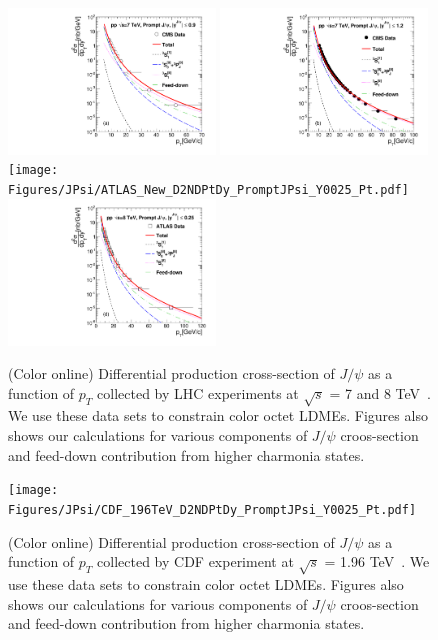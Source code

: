\documentclass[aps,prc,preprint,superscriptaddress,showpacs,showkeys,amsmath]{revtex4-1}
\begin{document}
\begin{figure}
\includegraphics[width=0.49\textwidth]{Figures/JPsi/CMS_New_D2NDPtDy_PromptJPsi_Y0009_Pt.pdf}
\includegraphics[width=0.49\textwidth]{Figures/JPsi/CMS_Latest_D2NDPtDy_PromptJPsi_Y0012_Pt.pdf}
\texttt{[image: Figures/JPsi/ATLAS\_New\_D2NDPtDy\_PromptJPsi\_Y0025\_Pt.pdf]}
\includegraphics[width=0.49\textwidth]{Figures/JPsi/ATLAS_8TeV_D2NDPtDy_PromptJPsi_Y0025_Pt.pdf}
\caption{(Color online) Differential production cross-section of $J/\psi$ as a function of $p_{T}$ 
collected by LHC experiments at $\sqrt{s}$ = 7 and 8 TeV~\cite{Chatrchyan:2011kc,Khachatryan:2015rra,Aad:2015duc}. 
We use these data sets to constrain color octet LDMEs. Figures also shows our calculations for various components 
of $J/\psi$ croos-section and feed-down contribution from higher charmonia states.}
\label{Fig:LDMEJPsi}
\end{figure}


\begin{figure}
\texttt{[image: Figures/JPsi/CDF\_196TeV\_D2NDPtDy\_PromptJPsi\_Y0025\_Pt.pdf]}
\caption{(Color online) Differential production cross-section of $J/\psi$ as a function of $p_{T}$ 
collected by CDF experiment at $\sqrt{s}$ = 1.96 TeV~\cite{Acosta:2004yw}. 
We use these data sets to constrain color octet LDMEs. Figures also shows our calculations for various components 
of $J/\psi$ croos-section and feed-down contribution from higher charmonia states.}
\label{Fig:LDMEJPsiCDF}
\end{figure}
\end{document}
